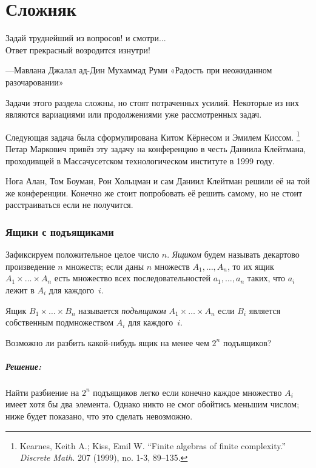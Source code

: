 \chapter*{Сложняк}

\epigraph{Задай  труднейший  из  вопросов!  и  смотри...\\
Ответ  прекрасный  возродится  изнутри!}{---Мавлана Джалал ад-Дин Мухаммад Руми «Радость   при   неожиданном разочаровании»
}

Задачи этого раздела сложны, но стоят потраченных усилий.
Некоторые из них являются вариациями или продолжениями уже рассмотренных задач.

\medskip

Следующая задача была сформулирована
Китом Кёрнесом %
и Эмилем Киссом.%
\footnote{Kearnes, Keith A.; Kiss, Emil W. ``Finite algebras of finite complexity.'' \emph{Discrete Math.} 207 (1999), no. 1-3, 89–135.}
Петар Маркович привёз эту задачу на конференцию в честь Даниила Клейтмана, проходивщей в Массачусетском технологическом институте в 1999 году.

Нога Алан, Том Боуман, Рон Хольцман и сам Даниил Клейтман решили её на той же конференции.
Конечно же стоит попробовать её решить самому, но не стоит расстраиваться если не получится.

\subsection*{Ящики с подъящиками}

Зафиксируем положительное целое число $n$.
\emph{Ящиком} будем называть декартово произведение $n$ множеств;
если даны $n$ множеств $A_1,\dots,A_n$, то их ящик $A_1{\times}\dots{\times}A_n$ есть множество всех последовательностей $a_1,\dots,a_n$ таких,
что $a_i$ лежит в $A_i$ для каждого~$i$.

Ящик $B_1{\times}\dots{\times}B_n$ называется \emph{подъящиком} $A_1{\times}\dots{\times}A_n$ если $B_i$ является собственным подмножеством $A_i$ для каждого~$i$. 

Возможно ли разбить какой-нибудь ящик на менее чем $2^n$ подъящиков?

\paragraph{Решение:} Найти разбиение на $2^n$ подъящиков легко если конечно каждое множество $A_i$ имеет хотя бы два элемента.
Однако никто не смог обойтись меньшим числом; ниже будет показано, что это сделать невозможно.

